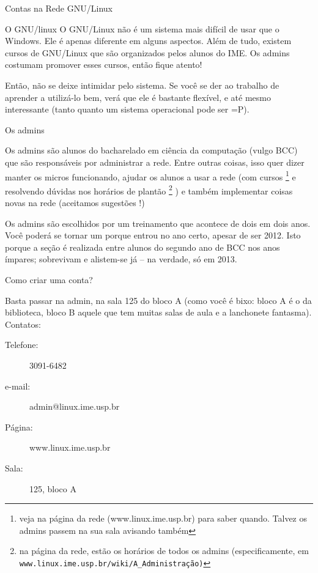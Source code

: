 \begin{secao}{Contas na Rede GNU/Linux}
\begin{subsecao}{O GNU/linux }
O GNU/Linux não é um sistema mais difícil de usar que o Windows. Ele é apenas
diferente em alguns aspectos. Além de tudo, existem cursos de GNU/Linux que são
organizados pelos alunos do IME. Os admins costumam promover esses cursos, então
fique atento!

Então, não se deixe intimidar pelo sistema. Se você se der ao trabalho de
aprender a utilizá-lo bem, verá que ele é bastante flexível, e até mesmo
interessante (tanto quanto um sistema operacional pode ser =P).

\end{subsecao}

\begin{subsecao}{Os admins}

Os admins são alunos do bacharelado em ciência da computação (vulgo BCC) que
são responsáveis por administrar a rede. Entre outras coisas, isso quer dizer
manter os micros funcionando, ajudar os alunos a usar a rede (com
cursos \footnote{ veja na página da rede (www.linux.ime.usp.br) para saber
quando. Talvez os admins passem na sua sala avisando também} e resolvendo
dúvidas nos horários de plantão \footnote{na página da rede, estão os horários
de todos os admins (especificamente, em {\tt www.linux.ime.usp.br/wiki/A\_Administração)}}
) e também implementar coisas novas na rede (aceitamos sugestões !)

Os admins são escolhidos por um treinamento que acontece de dois em dois anos.
Você poderá se tornar um porque entrou no ano certo, apesar de ser 2012. Isto
porque a seção é realizada entre alunos do segundo ano de BCC nos anos ímpares;
sobrevivam e alistem-se já – na verdade, só em 2013.

\end{subsecao}
\begin{subsecao}{Como criar uma conta?}

Basta passar na admin, na sala 125 do bloco A (como você é bixo: bloco A é o da
biblioteca, bloco B aquele que tem muitas salas de aula e a lanchonete
fantasma). Contatos:
\begin{description}

\item [Telefone:] 3091-6482
\item [e-mail:] admin@linux.ime.usp.br
\item [Página:] www.linux.ime.usp.br
\item [Sala:] 125, bloco A

\end{description}
\end{subsecao}
\end{secao}
